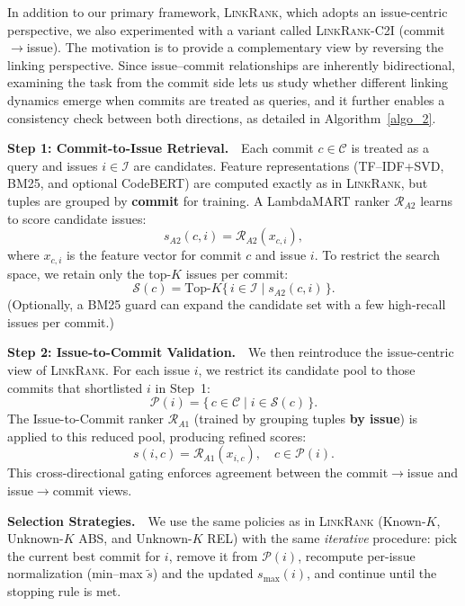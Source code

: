 In addition to our primary framework, \textsc{LinkRank}, which adopts an issue-centric perspective, we also experimented with a variant called \textsc{LinkRank-C2I} (commit$\rightarrow$issue). The motivation is to provide a complementary view by reversing the linking perspective. Since issue--commit relationships are inherently bidirectional, examining the task from the commit side lets us study whether different linking dynamics emerge when commits are treated as queries, and it further enables a consistency check between both directions, as detailed in Algorithm~\ref{algo_2}.



\textbf{Step 1: Commit-to-Issue Retrieval.}\ \
Each commit $c \in \mathcal{C}$ is treated as a query and issues $i \in \mathcal{I}$ are candidates. Feature representations (TF--IDF+SVD, BM25, and optional CodeBERT) are computed exactly as in \textsc{LinkRank}, but tuples are grouped by \textbf{commit} for training. A LambdaMART ranker $\mathcal{R}_{A2}$ learns to score candidate issues:
\[
s_{A2}(c,i) = \mathcal{R}_{A2}(x_{c,i}),
\]
where $x_{c,i}$ is the feature vector for commit $c$ and issue $i$. To restrict the search space, we retain only the top-$K$ issues per commit:
\[
\mathcal{S}(c) = \mathrm{Top}\text{-}K \{\, i \in \mathcal{I} \mid s_{A2}(c,i) \,\}.
\]
(Optionally, a BM25 guard can expand the candidate set with a few high-recall issues per commit.)

\textbf{Step 2: Issue-to-Commit Validation.}\ \
We then reintroduce the issue-centric view of \textsc{LinkRank}. For each issue $i$, we restrict its candidate pool to those commits that shortlisted $i$ in Step~1:
\[
\mathcal{P}(i) = \{\, c \in \mathcal{C} \mid i \in \mathcal{S}(c) \,\}.
\]
The Issue-to-Commit ranker $\mathcal{R}_{A1}$ (trained by grouping tuples \textbf{by issue}) is applied to this reduced pool, producing refined scores:
\[
s(i,c) = \mathcal{R}_{A1}(x_{i,c}), \quad c \in \mathcal{P}(i).
\]
This cross-directional gating enforces agreement between the commit$\rightarrow$issue and issue$\rightarrow$commit views.


\textbf{Selection Strategies.}\ \
We use the same policies as in \textsc{LinkRank} (Known-$K$, Unknown-$K$ ABS, and Unknown-$K$ REL) with the same \emph{iterative} procedure: pick the current best commit for $i$, remove it from $\mathcal{P}(i)$, recompute per-issue normalization (min--max $\tilde{s}$) and the updated $s_{\max}(i)$, and continue until the stopping rule is met.

